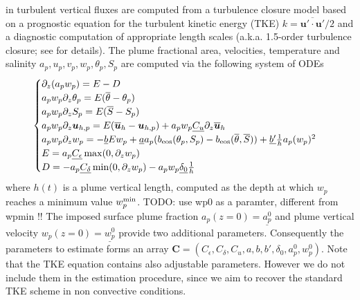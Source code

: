 \documentclass[draft]{agujournal2019}
\newcommand{\parenthese}[1]{\ensuremath{\left(#1\right)}} %
\newcommand{\blu}[1]{{\color{BlueGreen} #1}}
\begin{document}
in turbulent vertical fluxes are computed from a turbulence closure model based on a 
prognostic equation for the turbulent kinetic energy (TKE) 
$\displaystyle k = \overline{{\bm u}' \cdot {\bm u}'} / 2$ and a diagnostic 
computation of appropriate length scales (a.k.a. 1.5-order turbulence closure; see  for details). The plume fractional area, velocities, temperature and salinity $a_p, u_p, v_p,w_p, \theta_p, S_p$ are computed via the following system of ODEs
%
\begin{eqnarray*}
    \begin{cases}
        \partial_z (a_p w_p) = E-D
        \\
        a_p w_p \partial_z \theta_p = E (\overline{\theta} - \theta_p)
        \\
        a_p w_p \partial_z S_p = E (\overline{S} - S_p)   
        \\
        a_p w_p \partial_z \bm u_{h,p} = E (\overline{\bm u}_h - \bm u_{h,p}) + a_p w_p \underline{C_u} \partial_z   \overline{\bm u}_h 
        \\
        a_p w_p \partial_z w_p = - \underline{b} E w_p + \underline{a} a_p (b_{\rm{eos}}(\theta_p, S_p) - b_{\rm{eos}}(\overline{\theta},\overline{S}) ) +\underline{ b'} \frac{1}{h} a_p (w_p)^2 
        \\
        E = a_p \underline{C_{\epsilon}} \max (0,\partial_z w_p)
        \\
        D = -a_p \underline{C_{\delta}} \min (0,\partial_z w_p) - a_p w_p \underline{\delta_0}\frac{1}{h}
    \end{cases}
\end{eqnarray*}
%
where $h(t)$ is a plume vertical length, computed as the depth at which $w_p$ reaches a minimum value $w_p^{\rm min}$. \blu{TODO: use wp0 as a paramter, different from wpmin !!} The imposed surface plume fraction $a_p(z=0)=\underline{a_p^0}$ and plume vertical velocity $w_p(z=0) = \underline{w_p^0}$ provide two additional parameters. Consequently the parameters to estimate forms an array $\bm C = (C_\epsilon, C_\delta, C_u, a, b, b', \delta_0, a_p^0, w_p^0)$. Note that the TKE equation contains also adjustable parameters. However we do not include them in the estimation procedure, since we aim to recover the standard TKE scheme in non convective conditions.  


\end{document}
